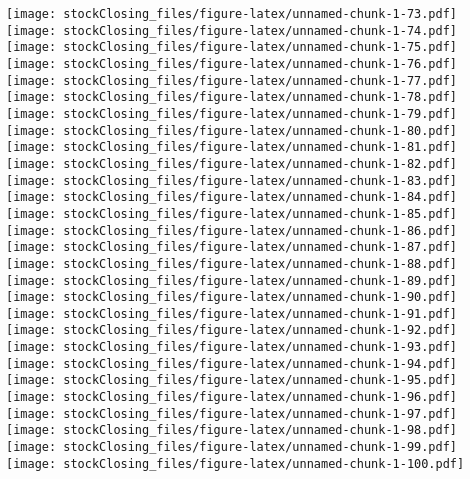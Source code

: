 \documentclass[]{article}
\begin{document}
\texttt{[image: stockClosing\_files/figure-latex/unnamed-chunk-1-73.pdf]}
\texttt{[image: stockClosing\_files/figure-latex/unnamed-chunk-1-74.pdf]}
\texttt{[image: stockClosing\_files/figure-latex/unnamed-chunk-1-75.pdf]}
\texttt{[image: stockClosing\_files/figure-latex/unnamed-chunk-1-76.pdf]}
\texttt{[image: stockClosing\_files/figure-latex/unnamed-chunk-1-77.pdf]}
\texttt{[image: stockClosing\_files/figure-latex/unnamed-chunk-1-78.pdf]}
\texttt{[image: stockClosing\_files/figure-latex/unnamed-chunk-1-79.pdf]}
\texttt{[image: stockClosing\_files/figure-latex/unnamed-chunk-1-80.pdf]}
\texttt{[image: stockClosing\_files/figure-latex/unnamed-chunk-1-81.pdf]}
\texttt{[image: stockClosing\_files/figure-latex/unnamed-chunk-1-82.pdf]}
\texttt{[image: stockClosing\_files/figure-latex/unnamed-chunk-1-83.pdf]}
\texttt{[image: stockClosing\_files/figure-latex/unnamed-chunk-1-84.pdf]}
\texttt{[image: stockClosing\_files/figure-latex/unnamed-chunk-1-85.pdf]}
\texttt{[image: stockClosing\_files/figure-latex/unnamed-chunk-1-86.pdf]}
\texttt{[image: stockClosing\_files/figure-latex/unnamed-chunk-1-87.pdf]}
\texttt{[image: stockClosing\_files/figure-latex/unnamed-chunk-1-88.pdf]}
\texttt{[image: stockClosing\_files/figure-latex/unnamed-chunk-1-89.pdf]}
\texttt{[image: stockClosing\_files/figure-latex/unnamed-chunk-1-90.pdf]}
\texttt{[image: stockClosing\_files/figure-latex/unnamed-chunk-1-91.pdf]}
\texttt{[image: stockClosing\_files/figure-latex/unnamed-chunk-1-92.pdf]}
\texttt{[image: stockClosing\_files/figure-latex/unnamed-chunk-1-93.pdf]}
\texttt{[image: stockClosing\_files/figure-latex/unnamed-chunk-1-94.pdf]}
\texttt{[image: stockClosing\_files/figure-latex/unnamed-chunk-1-95.pdf]}
\texttt{[image: stockClosing\_files/figure-latex/unnamed-chunk-1-96.pdf]}
\texttt{[image: stockClosing\_files/figure-latex/unnamed-chunk-1-97.pdf]}
\texttt{[image: stockClosing\_files/figure-latex/unnamed-chunk-1-98.pdf]}
\texttt{[image: stockClosing\_files/figure-latex/unnamed-chunk-1-99.pdf]}
\texttt{[image: stockClosing\_files/figure-latex/unnamed-chunk-1-100.pdf]}
\end{document}
